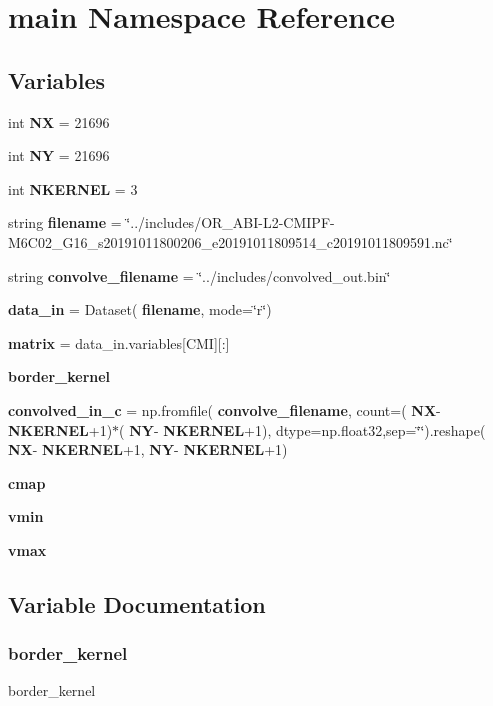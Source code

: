 \section{main Namespace Reference}
\label{namespacemain}
\subsection*{Variables}
\begin{DoxyCompactItemize}
\item 
int \textbf{ NX} = 21696
\item 
int \textbf{ NY} = 21696
\item 
int \textbf{ N\+K\+E\+R\+N\+EL} = 3
\item 
string \textbf{ filename} = \char`\"{}../includes/O\+R\+\_\+\+A\+BI-\/L2-\/C\+M\+I\+PF-\/M6\+C02\+\_\+\+G16\+\_\+s20191011800206\+\_\+e20191011809514\+\_\+c20191011809591.\+nc\char`\"{}
\item 
string \textbf{ convolve\+\_\+filename} = \char`\"{}../includes/convolved\+\_\+out.\+bin\char`\"{}
\item 
\textbf{ data\+\_\+in} = Dataset(\textbf{ filename}, mode=\char`\"{}r\char`\"{})
\item 
\textbf{ matrix} = data\+\_\+in.\+variables[\textquotesingle{}C\+MI\textquotesingle{}][\+:]
\item 
\textbf{ border\+\_\+kernel}
\item 
\textbf{ convolved\+\_\+in\+\_\+c} = np.\+fromfile(\textbf{ convolve\+\_\+filename}, count=(\textbf{ NX}-\/\textbf{ N\+K\+E\+R\+N\+EL}+1)$\ast$(\textbf{ NY}-\/\textbf{ N\+K\+E\+R\+N\+EL}+1), dtype=np.\+float32,sep=\char`\"{}\char`\"{}).reshape(\textbf{ NX}-\/\textbf{ N\+K\+E\+R\+N\+EL}+1,\textbf{ NY}-\/\textbf{ N\+K\+E\+R\+N\+EL}+1)
\item 
\textbf{ cmap}
\item 
\textbf{ vmin}
\item 
\textbf{ vmax}
\end{DoxyCompactItemize}


\subsection{Variable Documentation}
\mbox{\label{namespacemain_a896fa6862969b2496d05a321409f012b}} 
\subsubsection{border\+\_\+kernel}
{\footnotesize\ttfamily border\+\_\+kernel}

